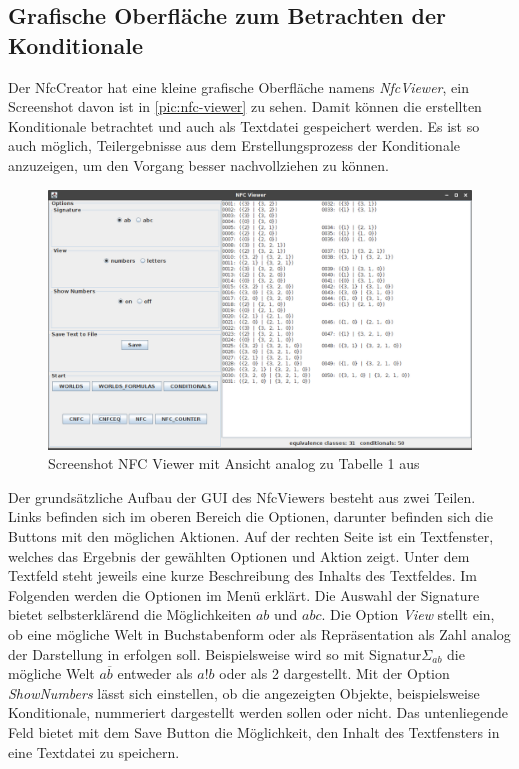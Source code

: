 \documentclass[12pt,a4paper]{article}
\begin{document}
\subsection{Grafische Oberfläche zum Betrachten der Konditionale}





Der NfcCreator hat eine kleine grafische Oberfläche namens \textit{NfcViewer}, ein Screenshot davon ist in \autoref{pic:nfc-viewer} zu sehen. Damit können die erstellten Konditionale betrachtet und auch als Textdatei gespeichert werden. Es ist so auch möglich, Teilergebnisse aus dem Erstellungsprozess der Konditionale anzuzeigen, um den Vorgang besser nachvollziehen zu können.


\begin{figure}
\includegraphics[width=0.9\linewidth]{bilder/NfcViewer.png}
\caption{Screenshot NFC Viewer mit Ansicht analog zu Tabelle 1 aus \cite{beierle19}}
\label{pic:nfc-viewer}
\end{figure}



Der grundsätzliche Aufbau der GUI des NfcViewers besteht aus zwei Teilen. Links befinden sich im oberen Bereich die Optionen, darunter befinden sich die Buttons mit den möglichen Aktionen. Auf der rechten Seite ist ein Textfenster, welches das Ergebnis der gewählten Optionen und Aktion zeigt. Unter dem Textfeld steht jeweils eine kurze Beschreibung des Inhalts des Textfeldes. Im Folgenden werden die Optionen im Menü erklärt. Die Auswahl der Signature bietet selbsterklärend die Möglichkeiten $ab$ und $abc$. Die Option \textit{View} stellt ein, ob eine mögliche Welt in Buchstabenform oder als Repräsentation als Zahl analog der Darstellung in \cite{beierle19} erfolgen soll. Beispielsweise wird so mit Signatur$\Sigma_{ab}$ die mögliche Welt $a \overline{b}$ entweder als $a!b$ oder als 2 dargestellt. Mit der Option \textit{ShowNumbers} lässt sich einstellen, ob die angezeigten Objekte, beispielsweise Konditionale, nummeriert dargestellt werden sollen oder nicht. Das untenliegende Feld bietet mit dem Save Button die Möglichkeit, den Inhalt des Textfensters in eine Textdatei zu speichern.
\end{document}
